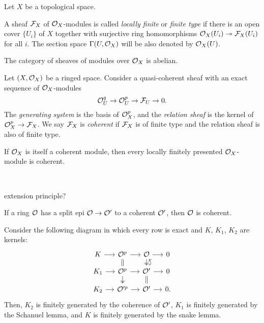 \documentclass{../../large}
\begin{document}
\begin{prb}
Let $X$ be a topological space.

A sheaf $\mathcal{F}_X$ of $\mathcal{O}_X$-modules is called \emph{locally finite} or \emph{finite type} if there is an open cover $\{U_i\}$ of $X$ together with surjective ring homomorphisms $\mathcal{O}_X(U_i)\twoheadrightarrow\mathcal{F}_X(U_i)$ for all $i$.
The section space $\Gamma(U,\mathcal{O}_X)$ will be also denoted by $\mathcal{O}_X(U)$.
\begin{parts}
\item The category of sheaves of modules over $\mathcal{O}_X$ is abelian.
\end{parts}
\end{prb}



\begin{prb}
Let $(X,\mathcal{O}_X)$ be a ringed space.
Consider a quasi-coherent sheaf with an exact sequence of $\mathcal{O}_X$-modules
\[\mathcal{O}_U^q\to\mathcal{O}_U^p\to\mathcal{F}_U\to0.\]
The \emph{generating system} is the basis of $\mathcal{O}_X^p$, and the \emph{relation sheaf} is the kernel of $\mathcal{O}_X^p\to\mathcal{F}_X$.
We say $\mathcal{F}_X$ is \emph{coherent} if $\mathcal{F}_X$ is of finite type and the relation sheaf is also of finite type.
\begin{parts}
\item If $\mathcal{O}_X$ is itself a coherent module, then every locally finitely presented $\mathcal{O}_X$-module is coherent.
\end{parts}
\end{prb}



\begin{prb}\,
\begin{parts}
\item extension principle?
\item If a ring $\mathcal{O}$ has a split epi $\mathcal{O}\to\mathcal{O}'$ to a coherent $\mathcal{O}'$, then $\mathcal{O}$ is coherent.
\end{parts}
\end{prb}
\begin{pf}
Consider the following diagram in which every row is exact and $K$, $K_1$, $K_2$ are kernels:
\[\begin{tikzcd}[sep=small]
K \rar & \cO^p \rar\dar[equals] & \cO \rar\dar[two heads] & 0\\
K_1 \rar & \cO^p \rar\dar[two heads] & \cO' \rar\dar[equals]\uar[hookrightarrow,bend right] & 0\\
K_2 \rar & \cO'^p \rar & \cO' \rar & 0.
\end{tikzcd}\]
Then, $K_2$ is finitely generated by the coherence of $\mathcal{O}'$, $K_1$ is finitely generated by the Schanuel lemma, and $K$ is finitely generated by the snake lemma.
\end{pf}
\end{document}
